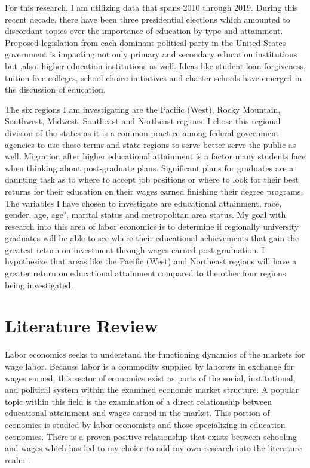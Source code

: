 \documentclass[12pt, English]{article}
\begin{document}
For this research, I am utilizing data that spans 2010 through 2019. During this recent decade, there have been three presidential elections which amounted to discordant topics over the importance of education by type and attainment. Proposed legislation from each dominant political party in the United States government is impacting not only primary and secondary education institutions but ,also, higher education institutions as well. Ideas like student loan forgiveness, tuition free colleges, school choice initiatives and charter schools have emerged in the discussion of education. 

The six regions I am investigating are the Pacific (West), Rocky Mountain, Southwest, Midwest, Southeast and Northeast regions. I chose this regional division of the states as it is a common practice among federal government agencies to use these terms and state regions to serve better serve the public as well. Migration after higher educational attainment is a factor many students face when thinking about post-graduate plans. Significant plans for graduates are a daunting task as to where to accept job positions or where to look for their best returns for their education on their wages earned finishing their degree programs. The variables I have chosen to investigate are educational attainment, race, gender, age, age², marital status and metropolitan area status. My goal with research into this area of labor economics is to determine if regionally university graduates will be able to see where their educational achievements that gain the greatest return on investment through wages earned post-graduation. I hypothesize that areas like the Pacific (West) and Northeast regions will have a greater return on educational attainment compared to the other four regions being investigated.

 
\section{Literature Review}
Labor economics seeks to understand the functioning dynamics of the markets for wage labor. Because labor is a commodity supplied by laborers in exchange for wages earned, this sector of economics exist as parts of the social, institutional, and political system within the examined economic market structure. A popular topic within this field is the examination of a direct relationship between educational attainment and wages earned in the market. This portion of economics is studied by labor economists and those specializing in education economics. There is a proven positive relationship that exists between schooling and wages which has led to my choice to add my own research into the literature realm \citep{dickson2011economic}. 
\end{document}
